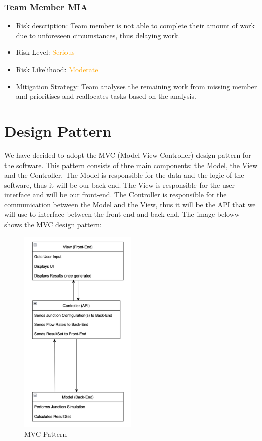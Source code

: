 \documentclass{article}
\begin{document}
\subsubsection{Team Member MIA}
\begin{itemize}
    \item Risk description: Team member is not able to complete their amount of work due to unforeseen circumstances, thus delaying work. 
    \item Risk Level: \textcolor{orange}{Serious}
    \item Risk Likelihood: \textcolor{orange}{Moderate}
    \item Mitigation Strategy: Team analyses the remaining work from missing member and prioritises and reallocates tasks based on the analysis. 
\end{itemize}

\section{Design Pattern}
We have decided to adopt the MVC (Model-View-Controller) design pattern for the software. This pattern consists of thre main components: the Model, the View and the Controller.
The Model is responsible for the data and the logic of the software, thus it will be our back-end. The View is responsible for the user interface and will be our front-end. The Controller is responsible for the communication between the Model and the View, 
thus it will be the API that we will use to interface between the front-end and back-end. The image beloww shows the MVC design pattern:

\begin{figure}[H]
    \centering
    \includegraphics[width=0.5\textwidth]{pattern.png}
    \caption{MVC Pattern}
    \label{pattern}
\end{figure}
\end{document}
